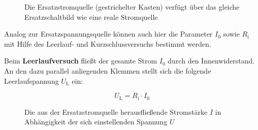 \begin{frame}
{\begin{figure}[h!]
\begin{center}
			

		\end{center}
		
		\caption{Die Ersatzstromquelle (gestrichelter Kasten) verfügt über das gleiche Ersatzschaltbild wie eine reale Stromquelle}
		\label{fig:ersatzstromquelle2}
	\end{figure}

	Analog zur Ersatzspannungsquelle können auch hier die Parameter $I_0$ sowie $R_\mathrm{i}$ mit Hilfe des 
	Leerlauf- und Kurzschlussversuchs bestimmt werden.  

	Beim \textbf{Leerlaufversuch} fließt der gesamte Strom $I_0$ durch den Innenwiderstand. An den dazu parallel anliegenden
	Klemmen stellt sich die folgende Leerlaufspannung $U_\mathrm{L}$ ein:

	\begin{equation*}
		U_\mathrm{L} = R_\mathrm{i} \cdot I_0
	\end{equation*}


	\begin{figure}[h!]
		\centering
		
		
		\caption{Die aus der Ersatzstromquelle herausfließende Stromstärke $I$ in Abhängigkeit der sich einstellenden Spannung $U$}
		\label{fig:kennliniestrom}
	\end{figure}



}
\end{frame}
